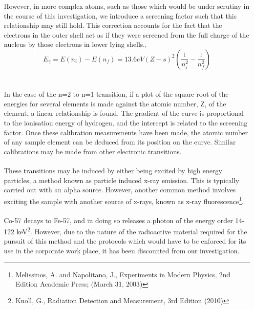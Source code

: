 \documentclass[a4paper ,12pt]{article}
\begin{document}
However, in more complex atoms, such as those which would be under scrutiny in the course of this investigation, we introduce a screening factor such that this relationship may still hold. This correction accounts for the fact that the electrons in the outer shell act as if they were screened from the full charge of the nucleus by those electrons in lower lying shells.,\\\begin{displaymath} E_{\gamma} = E(n_{i})-E(n_{f}) =13.6eV(Z-s)^2\left(\frac{1}{n^2_i}-\frac{1}{n^2_f}\right) \end{displaymath}\\\\In the case of the n=2 to n=1 transition, if a plot of the square root of the energies for several elements is made against the atomic number, Z, of the element, a linear relationship is found. The gradient of the curve is proportional to the ionisation energy of hydrogen, and the intercept is related to the screening factor. Once these calibration measurements have been made, the atomic number of any sample element can be deduced from its position on the curve. Similar calibrations may be made from other electronic transitions.\\\\These transitions may be induced by either being excited by high energy particles, a method known as particle induced x-ray emission. This is typically carried out with an alpha source. However, another common method involves exciting the sample with another source of x-rays, known as x-ray fluorescence\footnote{Melissinos, A. and Napolitano, J., Experiments in Modern Physics, 2nd Edition Academic Press; (March 31, 2003)}.\\\\Co-57 decays to Fe-57, and in doing so releases a photon of the energy order 14-122 keV\footnote{Knoll, G., Radiation Detection and Measurement, 3rd Edition (2010)}.   However, due to the nature of the radioactive material required for the pursuit of this method and the protocols which would have to be enforced for its use in the corporate work place, it has been discounted from our investigation.
\end{document}

